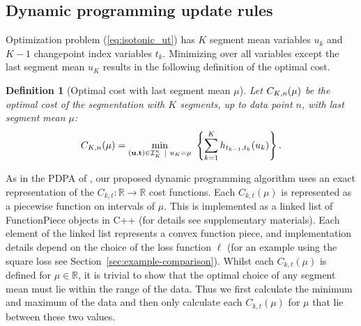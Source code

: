 \documentclass[aoas]{imsart}
\newtheorem{definition}{Definition}
\newcommand{\RR}{\mathbb R}
\begin{document}
\subsection{Dynamic programming update rules}
\label{sec:dyn-prog}
Optimization problem (\ref{eq:isotonic_ut}) has $K$ segment mean
variables $u_k$ and $K-1$ changepoint index variables $t_k$. Minimizing over all
variables except the last segment mean $u_K$ results in the following
definition of the optimal cost.



\begin{definition}[Optimal cost with last segment mean $\mu$]
\label{def:fcc}
  Let $C_{K,n}(\mu)$ be the optimal cost of the segmentation
  with $K$ segments, up to data point $n$, with last segment mean
  $\mu$:
\begin{equation}
\FCC_{K,n}(\mu) = \min_{(\mathbf u, \mathbf t)\in{\mathcal I}^n_K \ | \ u_K = \mu} \
  \left\{ \sum_{k=1}^K
  h_{t_{k-1}, t_k}(u_k) \right\}.
\end{equation}
\end{definition}

As in the PDPA of \citet{pruned-dp}, our proposed dynamic programming
algorithm uses an exact representation of the
$C_{k,t}:\RR\rightarrow\RR$ cost functions. Each $C_{k,t}(\mu)$ is
represented as a piecewise function on intervals of $\mu$. This is
implemented as a linked list of FunctionPiece objects in C++ (for
details see supplementary materials). Each element of the linked list
represents a convex function piece, and implementation details depend
on the choice of the loss function $\ell$ (for an example using the
square loss see Section~\ref{sec:example-comparison}). Whilst each
$C_{k,t}(\mu)$ is defined for $\mu \in \RR$, it is trivial to show
that the optimal choice of any segment mean must lie within the range
of the data. Thus we first calculate the minimum and maximum of the
data and then only calculate each $C_{k,t}(\mu)$ for $\mu$ that lie
between these two values.
\end{document}

